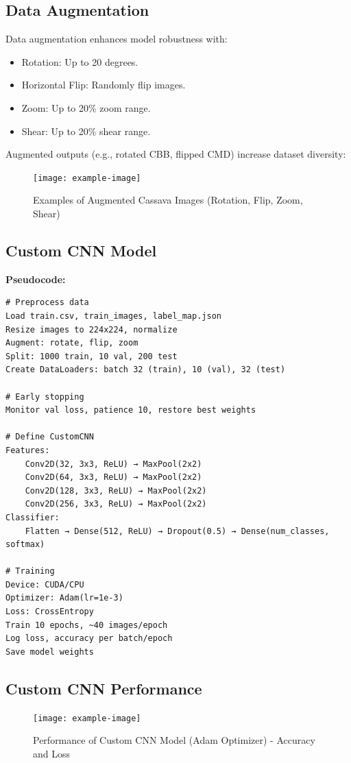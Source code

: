 \documentclass[a4paper,12pt]{article}
\begin{document}
\subsection*{Data Augmentation}
Data augmentation enhances model robustness with:
\begin{itemize}
    \item Rotation: Up to 20 degrees.
    \item Horizontal Flip: Randomly flip images.
    \item Zoom: Up to 20\% zoom range.
    \item Shear: Up to 20\% shear range.
\end{itemize}
Augmented outputs (e.g., rotated CBB, flipped CMD) increase dataset diversity:

\begin{figure}[H]
    \centering
    \texttt{[image: example-image]}
    \caption{Examples of Augmented Cassava Images (Rotation, Flip, Zoom, Shear)}
\end{figure}

\subsection*{Custom CNN Model}
\textbf{Pseudocode:}
\begin{verbatim}
# Preprocess data
Load train.csv, train_images, label_map.json
Resize images to 224x224, normalize
Augment: rotate, flip, zoom
Split: 1000 train, 10 val, 200 test
Create DataLoaders: batch 32 (train), 10 (val), 32 (test)

# Early stopping
Monitor val loss, patience 10, restore best weights

# Define CustomCNN
Features:
    Conv2D(32, 3x3, ReLU) → MaxPool(2x2)
    Conv2D(64, 3x3, ReLU) → MaxPool(2x2)
    Conv2D(128, 3x3, ReLU) → MaxPool(2x2)
    Conv2D(256, 3x3, ReLU) → MaxPool(2x2)
Classifier:
    Flatten → Dense(512, ReLU) → Dropout(0.5) → Dense(num_classes, softmax)

# Training
Device: CUDA/CPU
Optimizer: Adam(lr=1e-3)
Loss: CrossEntropy
Train 10 epochs, ~40 images/epoch
Log loss, accuracy per batch/epoch
Save model weights
\end{verbatim}

\subsection*{Custom CNN Performance}
\begin{figure}[H]
    \centering
    \texttt{[image: example-image]}
    \caption{Performance of Custom CNN Model (Adam Optimizer) - Accuracy and Loss}
\end{figure}
\end{document}
